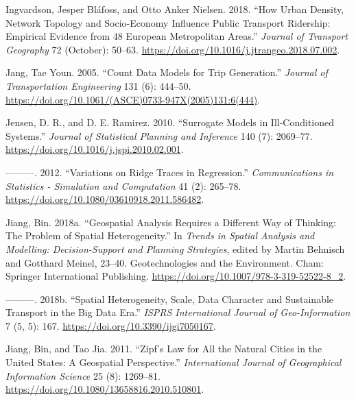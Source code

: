 \documentclass[
  11pt,
  openany]{memoir}
\newlength{\cslhangindent}
\newlength{\cslentryspacingunit} %
\newenvironment{CSLReferences}[2] %
 {%
  \setlength{\parindent}{0pt}
  \ifodd #1
  \let\oldpar\par
  \def\par{\hangindent=\cslhangindent\oldpar}
  \fi
  \setlength{\parskip}{#2\cslentryspacingunit}
 }%
 {}
\begin{document}
\begin{CSLReferences}{1}{0}
\leavevmode{}%
Ingvardson, Jesper Bláfoss, and Otto Anker Nielsen. 2018. {``How Urban Density, Network Topology and Socio-Economy Influence Public Transport Ridership: Empirical Evidence from 48 {European} Metropolitan Areas.''} \emph{Journal of Transport Geography} 72 (October): 50--63. \url{https://doi.org/10.1016/j.jtrangeo.2018.07.002}.

\leavevmode{}%
Jang, Tae Youn. 2005. {``Count {Data Models} for {Trip Generation}.''} \emph{Journal of Transportation Engineering} 131 (6): 444--50. \url{https://doi.org/10.1061/(ASCE)0733-947X(2005)131:6(444)}.

\leavevmode{}%
Jensen, D. R., and D. E. Ramirez. 2010. {``Surrogate Models in Ill-Conditioned Systems.''} \emph{Journal of Statistical Planning and Inference} 140 (7): 2069--77. \url{https://doi.org/10.1016/j.jspi.2010.02.001}.

\leavevmode{}%
---------. 2012. {``Variations on {Ridge Traces} in {Regression}.''} \emph{Communications in Statistics - Simulation and Computation} 41 (2): 265--78. \url{https://doi.org/10.1080/03610918.2011.586482}.

\leavevmode{}%
Jiang, Bin. 2018a. {``Geospatial {Analysis Requires} a {Different Way} of {Thinking}: The {Problem} of {Spatial Heterogeneity}.''} In \emph{Trends in {Spatial Analysis} and {Modelling}: Decision-{Support} and {Planning Strategies}}, edited by Martin Behnisch and Gotthard Meinel, 23--40. Geotechnologies and the {Environment}. {Cham}: {Springer International Publishing}. \url{https://doi.org/10.1007/978-3-319-52522-8_2}.

\leavevmode{}%
---------. 2018b. {``Spatial {Heterogeneity}, {Scale}, {Data Character} and {Sustainable Transport} in the {Big Data Era}.''} \emph{ISPRS International Journal of Geo-Information} 7 (5, 5): 167. \url{https://doi.org/10.3390/ijgi7050167}.

\leavevmode{}%
Jiang, Bin, and Tao Jia. 2011. {``Zipf's Law for All the Natural Cities in the {United States}: A Geospatial Perspective.''} \emph{International Journal of Geographical Information Science} 25 (8): 1269--81. \url{https://doi.org/10.1080/13658816.2010.510801}.


\end{CSLReferences}
\end{document}
